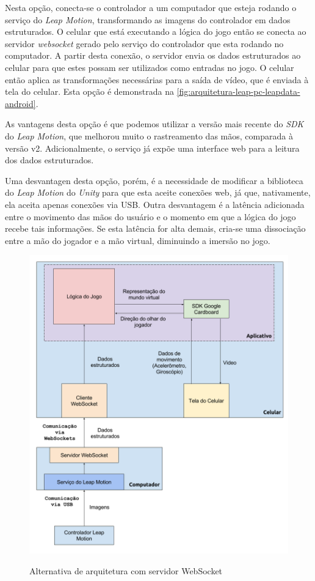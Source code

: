 Nesta opção, conecta-se o controlador a um computador que esteja rodando o 
serviço do \textit{Leap Motion}, transformando as imagens do controlador em 
dados estruturados. O celular que está executando a lógica do jogo então se
conecta ao servidor \textit{websocket} gerado pelo serviço do controlador que 
esta rodando no computador. A partir desta conexão, o servidor envia os
dados estruturados ao celular para que estes possam ser utilizados como 
entradas no jogo. O celular então aplica as transformações necessárias para 
a saída de vídeo, que é enviada à tela do celular.
Esta opção é demonstrada na \autoref{fig:arquitetura-leap-pc-leapdata-android}.

As vantagens desta opção é que podemos utilizar a versão mais recente 
do \textit{SDK} do \textit{Leap Motion}, que melhorou muito o rastreamento das 
mãos, comparada à versão v2. Adicionalmente, o serviço já expõe uma interface 
web para a leitura dos dados estruturados. 

Uma desvantagen desta opção, porém, é a necessidade de modificar a biblioteca 
do \textit{Leap Motion} do \textit{Unity} para que esta aceite conexões web, já 
que, nativamente, ela aceita apenas conexões via USB. Outra desvantagem é a 
latência adicionada entre o movimento das mãos do usuário e o momento em que 
a lógica do jogo recebe tais informações. Se esta latência for alta demais, 
cria-se uma dissociação entre a mão do jogador e a mão virtual, 
diminuindo a imersão no jogo.

\begin{figure}[h]
	\centering
	\caption{Alternativa de arquitetura com servidor WebSocket}
	\includegraphics[width=0.7\linewidth]{images/Arquitetura-leap-pc-leapdata-android}
	\legend{\fonteAP}
	\label{fig:arquitetura-leap-pc-leapdata-android}
\end{figure}

